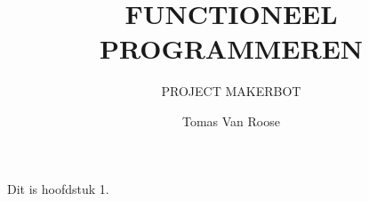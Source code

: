 \documentclass[a4paper, twoside, 12pt]{ugent_report}
\begin{document}
\title{FUNCTIONEEL PROGRAMMEREN}
\subtitle{PROJECT MAKERBOT}
\author{Tomas Van Roose}
\maketitle


Dit is hoofdstuk 1.
\end{document}
